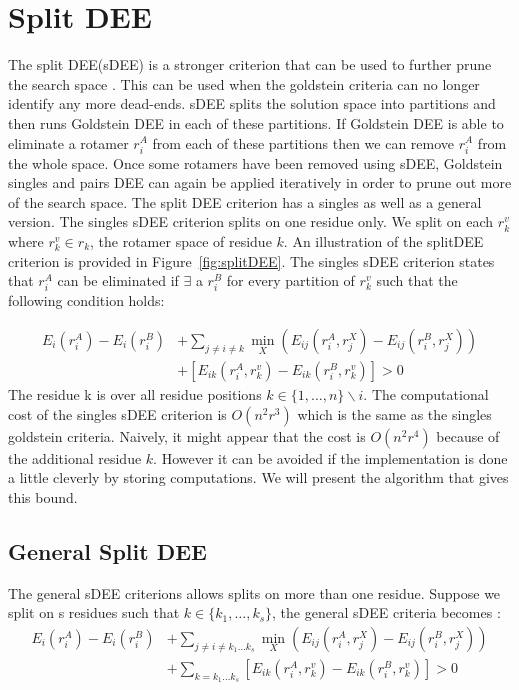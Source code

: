 \documentclass{article}
\begin{document}
\section{Split DEE}
The split DEE(sDEE) is a stronger criterion that can be used to further prune the search space \cite{Pierce2000}. This can be used when the goldstein criteria can no longer identify any more dead-ends. sDEE splits the solution space into partitions and then runs Goldstein DEE in each of these partitions. If Goldstein DEE is able to eliminate a rotamer $r_i^A$ from each of these partitions then we can remove $r_i^A$ from the whole space. Once some rotamers have been removed using sDEE, Goldstein singles and pairs DEE can again be applied iteratively in order to prune out more of the search space. The split DEE criterion has a singles as well as a general version. The singles sDEE criterion splits on one residue only. We split on each $r_k^v$ where $r_k^v \in r_k$, the rotamer space of residue $k$. An illustration of the splitDEE criterion is provided in Figure~\ref{fig:splitDEE}. The singles sDEE criterion states that $r_i^A$ can be eliminated if $\exists$ a $r_i^B$ for every partition of $r_k^v$ such that the following condition holds: 

\begin{equation}
\label{eqn:sDEE_singles}
\begin{split}
E_i(r_i^A) - E_i(r_i^B) &+ \sum_{j\neq i \neq k} \min_X \left(E_{ij}(r_i^A,r_j^X)-E_{ij}(r_i^B,r_j^X) \right)\\
&+ \left[E_{ik}(r_i^A,r_k^v)-E_{ik}(r_i^B,r_k^v)\right] > 0 
\end{split}
\end{equation}
The residue k is over all residue positions $k \in \{1,\dots, n\}\backslash i$. The computational cost of the singles sDEE criterion is $O(n^2r^3)$ which is the same as the singles goldstein criteria. Naively, it might appear that the cost is $O(n^2r^4)$ because of the additional residue $k$. However it can be avoided if the implementation is done a little cleverly by storing computations. We will present the algorithm that gives this bound. 

\subsection{General Split DEE}
The general sDEE criterions allows splits on more than one residue. Suppose we split on s residues such that $k \in \{k_1,\dots,k_s\}$, the general sDEE criteria becomes :
\begin{equation}
\label{eqn:sDEE_gen}
\begin{split}
E_i(r_i^A) - E_i(r_i^B) &+ \sum_{j\neq i \neq k_1\dots k_s} \min_X \left(E_{ij}(r_i^A,r_j^X)-E_{ij}(r_i^B,r_j^X) \right)\\
&+ \sum_{k=k_1\dots k_s}\left[E_{ik}(r_i^A,r_k^v)-E_{ik}(r_i^B,r_k^v)\right] > 0 
\end{split}
\end{equation}
\end{document}

